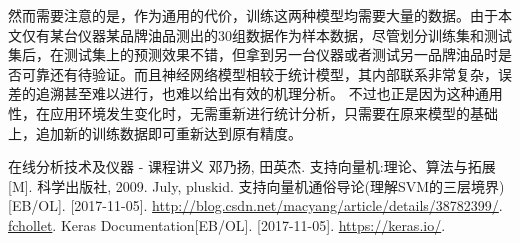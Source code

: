 \documentclass[a4paper]{article}
\begin{document}
		\begin{table}
			\caption{各模型精度对比}
			\label{table:model-compare}
			\small
		\end{table}
		
		然而需要注意的是，作为通用的代价，训练这两种模型均需要大量的数据。由于本文仅有某台仪器某品牌油品测出的30组数据作为样本数据，尽管划分训练集和测试集后，在测试集上的预测效果不错，但拿到另一台仪器或者测试另一品牌油品时是否可靠还有待验证。而且神经网络模型相较于统计模型，其内部联系非常复杂，误差的追溯甚至难以进行，也难以给出有效的机理分析。
		不过也正是因为这种通用性，在应用环境发生变化时，无需重新进行统计分析，只需要在原来模型的基础上，追加新的训练数据即可重新达到原有精度。
		
	\small
	\renewcommand{\refname}{参考资料}
	\begin{thebibliography}{9}
		\bibitem{} 在线分析技术及仪器 - 课程讲义
		\bibitem{} 邓乃扬, 田英杰. 支持向量机:理论、算法与拓展[M]. 科学出版社, 2009.
		\bibitem{} July, pluskid. 支持向量机通俗导论(理解SVM的三层境界)[EB/OL]. [2017-11-05]. \url{http://blog.csdn.net/macyang/article/details/38782399/}.
		\bibitem{} \href{https://github.com/fchollet}{fchollet}. Keras Documentation[EB/OL]. [2017-11-05]. \url{https://keras.io/}.
	\end{thebibliography}
\end{document}
